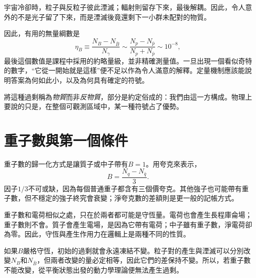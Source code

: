 宇宙冷卻時，粒子與反粒子彼此湮滅；輻射則留存下來，最後解耦。因此，令人意外的不是光子留了下來，而是湮滅後竟還剩下一小群未配對的物質。

因此，有用的無量綱數是
\begin{equation}
\eta_B
\equiv
\frac{N_B-N_{\bar B}}{N_\gamma}
\sim
\frac{N_p-N_{\bar p}}{N_p+N_{\bar p}}
\sim 10^{-8},
\label{eq:c08-baryon-asymmetry}
\end{equation}
最後這個數值是課程中採用的約略量級，並非精確測量值。一旦出現一個看似奇特的數字，``它從一開始就是這樣''便不足以作為令人滿意的解釋。定量機制應該能說明答案為何如此小，以及為何具有確定的符號。

將這種過剩稱為\emph{物質}而非\emph{反物質}，部分是約定俗成的：我們由這一方構成。物理上要說的只是，在整個可觀測區域中，某一種符號占了優勢。

\section{重子數與第一個條件}

重子數的歸一化方式是讓質子或中子帶有\(B=1\)。用夸克來表示，
\begin{equation}
B=\frac{N_q-N_{\bar q}}{3}.
\label{eq:c08-baryon-number}
\end{equation}
因子\(1/3\)不可或缺，因為每個普通重子都含有三個價夸克。其他強子也可能帶有重子數，但不穩定的強子終究會衰變；淨夸克數的差額則是更一般的記帳方式。

\begin{classroomqa}
\end{classroomqa}

重子數和電荷相似之處，只在於兩者都可能是守恆量。電荷也會產生長程庫侖場；重子數則不會。質子會產生電場，是因為它帶有電荷；中子雖有重子數，淨電荷卻為零。因此，守恆與產生作用力在邏輯上是兩種不同的性質。

\begin{classroomqa}
\end{classroomqa}

如果\(B\)嚴格守恆，初始的過剩就會永遠凍結不變。粒子對的產生與湮滅可以分別改變\(N_B\)和\(N_{\bar B}\)，但兩者改變的量必定相等，因此它們的差保持不變。所以，若重子數不能改變，從平衡狀態出發的動力學理論便無法產生過剩。

